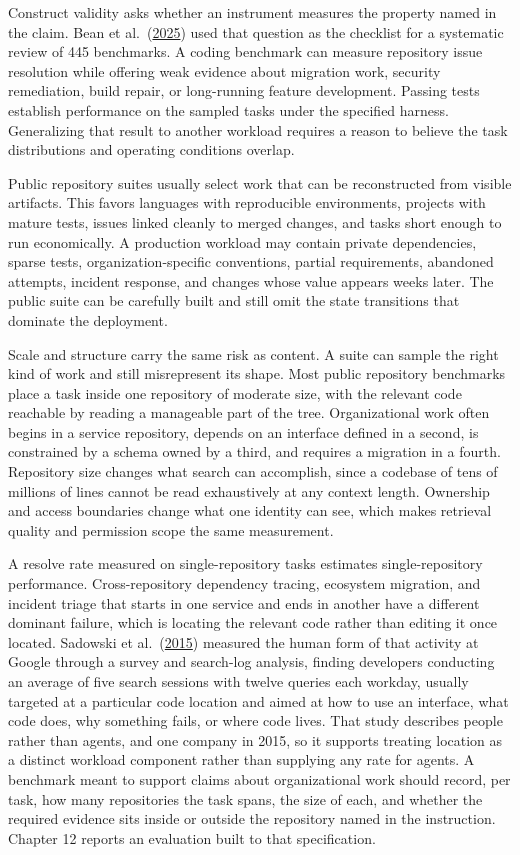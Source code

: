 Construct validity asks whether an instrument measures the property named in the claim. Bean et al.~(\href{https://arxiv.org/abs/2511.04703}{2025}) used that question as the checklist for a systematic review of 445 benchmarks. A coding benchmark can measure repository issue resolution while offering weak evidence about migration work, security remediation, build repair, or long-running feature development. Passing tests establish performance on the sampled tasks under the specified harness. Generalizing that result to another workload requires a reason to believe the task distributions and operating conditions overlap.

Public repository suites usually select work that can be reconstructed from visible artifacts. This favors languages with reproducible environments, projects with mature tests, issues linked cleanly to merged changes, and tasks short enough to run economically. A production workload may contain private dependencies, sparse tests, organization-specific conventions, partial requirements, abandoned attempts, incident response, and changes whose value appears weeks later. The public suite can be carefully built and still omit the state transitions that dominate the deployment.

Scale and structure carry the same risk as content. A suite can sample the right kind of work and still misrepresent its shape. Most public repository benchmarks place a task inside one repository of moderate size, with the relevant code reachable by reading a manageable part of the tree. Organizational work often begins in a service repository, depends on an interface defined in a second, is constrained by a schema owned by a third, and requires a migration in a fourth. Repository size changes what search can accomplish, since a codebase of tens of millions of lines cannot be read exhaustively at any context length. Ownership and access boundaries change what one identity can see, which makes retrieval quality and permission scope the same measurement.

A resolve rate measured on single-repository tasks estimates single-repository performance. Cross-repository dependency tracing, ecosystem migration, and incident triage that starts in one service and ends in another have a different dominant failure, which is locating the relevant code rather than editing it once located. Sadowski et al.~(\href{https://doi.org/10.1145/2786805.2786855}{2015}) measured the human form of that activity at Google through a survey and search-log analysis, finding developers conducting an average of five search sessions with twelve queries each workday, usually targeted at a particular code location and aimed at how to use an interface, what code does, why something fails, or where code lives. That study describes people rather than agents, and one company in 2015, so it supports treating location as a distinct workload component rather than supplying any rate for agents. A benchmark meant to support claims about organizational work should record, per task, how many repositories the task spans, the size of each, and whether the required evidence sits inside or outside the repository named in the instruction. Chapter 12 reports an evaluation built to that specification.

